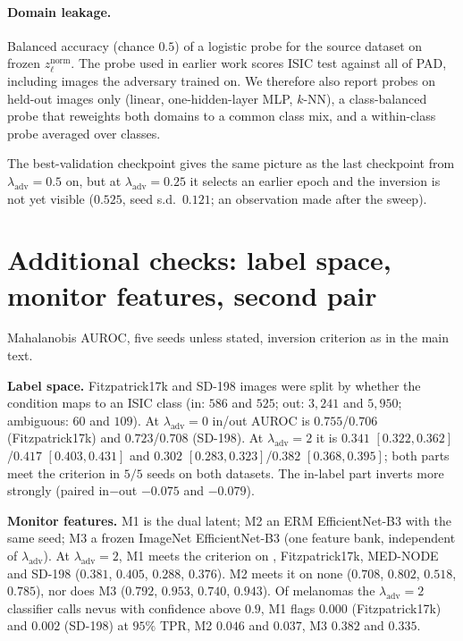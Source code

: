 \documentclass{midl}
\newcommand{\lam}{\lambda_{\mathrm{adv}}}
\begin{document}
\paragraph{Domain leakage.} Balanced accuracy (chance $0.5$) of a logistic probe for the
source dataset on frozen $z_\ell^{\mathrm{norm}}$. The probe used in earlier work scores
ISIC test against all of PAD, including images the adversary trained on. We therefore also
report probes on held-out images only (linear, one-hidden-layer MLP, $k$-NN), a
class-balanced probe that reweights both domains to a common class mix, and a within-class
probe averaged over classes.

The best-validation checkpoint gives the same picture as the last checkpoint from $\lam=0.5$
on, but at $\lam=0.25$ it selects an earlier epoch and the inversion is not yet visible
($0.525$, seed s.d.\ $0.121$; an observation made after the sweep).

\FloatBarrier
\section{Additional checks: label space, monitor features, second pair}
\label{app:r11}

Mahalanobis AUROC, five seeds unless stated, inversion criterion as in the main text.

\textbf{Label space.} Fitzpatrick17k and SD-198 images were split by whether the condition maps
to an ISIC class (in: $586$ and $525$; out: $3{,}241$ and $5{,}950$; ambiguous: $60$ and $109$).
At $\lam=0$ in/out AUROC is $0.755$/$0.706$ (Fitzpatrick17k) and $0.723$/$0.708$ (SD-198). At
$\lam=2$ it is $0.341$ $[0.322, 0.362]$/$0.417$ $[0.403, 0.431]$ and $0.302$ $[0.283, 0.323]$/$0.382$
$[0.368, 0.395]$; both parts meet the criterion in $5/5$ seeds on both datasets. The in-label part
inverts more strongly (paired in$-$out $-0.075$ and $-0.079$).

\textbf{Monitor features.} M1 is the dual latent; M2 an ERM EfficientNet-B3 with the same seed;
M3 a frozen ImageNet EfficientNet-B3 (one feature bank, independent of $\lam$). At $\lam=2$, M1
meets the criterion on \texttt{}, Fitzpatrick17k, MED-NODE and SD-198 ($0.381$, $0.405$,
$0.288$, $0.376$). M2 meets it on none ($0.708$, $0.802$, $0.518$, $0.785$), nor does M3 ($0.792$,
$0.953$, $0.740$, $0.943$). Of melanomas the $\lam=2$ classifier calls nevus with confidence above
$0.9$, M1 flags $0.000$ (Fitzpatrick17k) and $0.002$ (SD-198) at $95\%$ TPR, M2 $0.046$ and $0.037$,
M3 $0.382$ and $0.335$.
\end{document}
